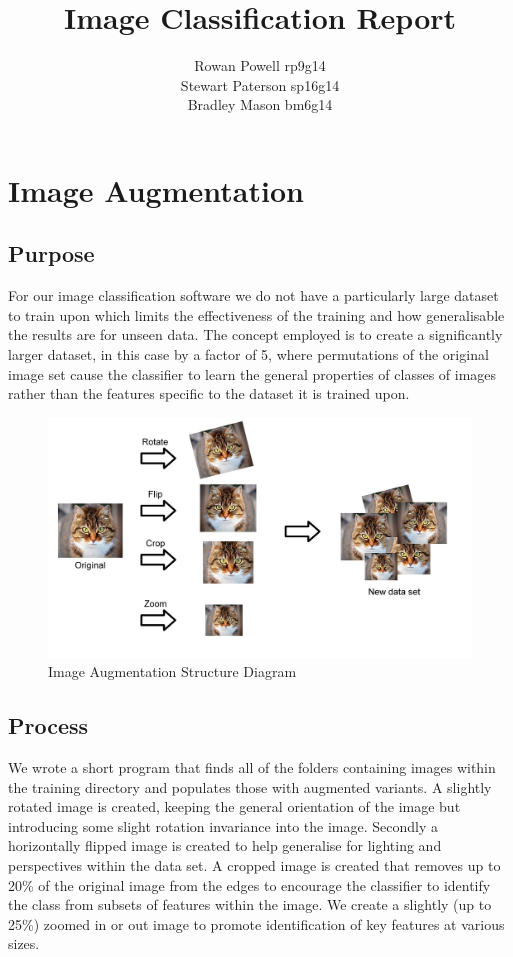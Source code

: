\documentclass{article}
\begin{document}
	\title{Image Classification Report}
	\author{Rowan Powell rp9g14\\Stewart Paterson sp16g14\\Bradley Mason bm6g14}
	\maketitle
	\newpage
	\section{Image Augmentation}
	
	\subsection{Purpose}
	For our image classification software we do not have a particularly large dataset to train upon which limits the effectiveness of the training and how generalisable the results are for unseen data. The concept employed is to create a significantly larger dataset, in this case by a factor of 5, where permutations of the original image set cause the classifier to learn the general properties of classes of images rather than the features specific to the dataset it is trained upon.
	
	\begin{figure}[h]
		\centering
		\includegraphics[scale=0.3]{augment}
		\caption{Image Augmentation Structure Diagram}
	\end{figure}
	
	\subsection{Process}
	We wrote a short program that finds all of the folders containing images within the training directory and populates those with augmented variants. A slightly rotated image is created, keeping the general orientation of the image but introducing some slight rotation invariance into the image. Secondly a horizontally flipped image is created to help generalise for lighting and perspectives within the data set. A cropped image is created that removes up to 20\% of the original image from the edges to encourage the classifier to identify the class from subsets of features within the image. We create a slightly (up to 25\%) zoomed in or out image to promote identification of key features at various sizes.
	
\end{document}
